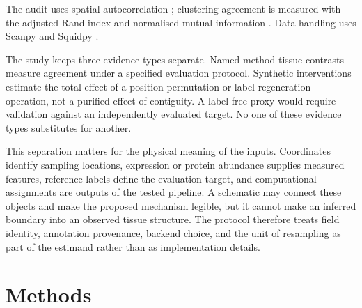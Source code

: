 \documentclass[11pt]{article}
\begin{document}
The audit uses spatial autocorrelation \citep{moran1950}; clustering agreement is measured
with the adjusted Rand index \citep{hubert1985ari} and normalised mutual information \citep{strehl2002nmi}.
Data handling uses Scanpy \citep{wolf2018scanpy} and Squidpy \citep{palla2022squidpy}.


The study keeps three evidence types separate. Named-method tissue contrasts measure agreement under a specified evaluation protocol. Synthetic interventions estimate the total effect of a position permutation or label-regeneration operation, not a purified effect of contiguity. A label-free proxy would require validation against an independently evaluated target. No one of these evidence types substitutes for another.

This separation matters for the physical meaning of the inputs. Coordinates identify sampling locations, expression or protein abundance supplies measured features, reference labels define the evaluation target, and computational assignments are outputs of the tested pipeline. A schematic may connect these objects and make the proposed mechanism legible, but it cannot make an inferred boundary into an observed tissue structure. The protocol therefore treats field identity, annotation provenance, backend choice, and the unit of resampling as part of the estimand rather than as implementation details.

\section{Methods}
\end{document}
